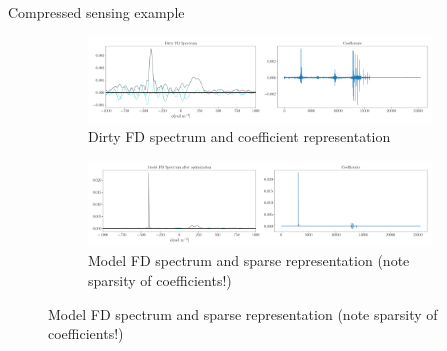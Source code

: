 \documentclass[xetex,aspectratio=169]{beamer}
\begin{document}
\begin{frame}{Compressed sensing example}
	\begin{figure}
		\centering
		\begin{subfigure}{\textwidth}
			\centering
			\includegraphics[width=.9\textwidth]{figures/cs/cs_before.pdf}
			\caption{Dirty FD spectrum and coefficient representation}
		\end{subfigure}

		\begin{subfigure}{\textwidth}
			\centering
			\includegraphics[width=.9\textwidth]{figures/cs/cs_after.pdf}
			\caption{Model FD spectrum and sparse representation (note sparsity of coefficients!)}
		\end{subfigure}
	\end{figure}
\end{frame}

%
\end{document}
